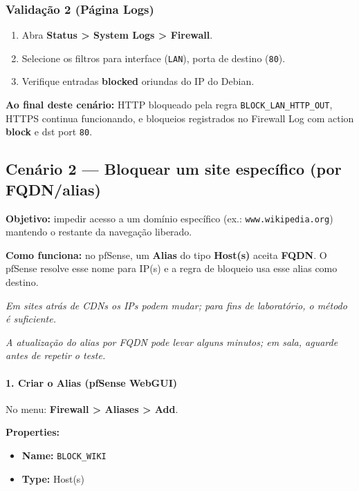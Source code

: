 \subsubsection*{Validação 2 (Página Logs)}

\begin{enumerate}
\item Abra \textbf{Status > System Logs > Firewall}.
\item Selecione os filtros para interface (\texttt{LAN}), porta de destino (\texttt{80}).
\item Verifique entradas \textbf{blocked} oriundas do IP do Debian.
\end{enumerate}


\begin{notebox}
\textbf{Ao final deste cenário:} HTTP bloqueado pela regra \texttt{BLOCK\_LAN\_HTTP\_OUT}, HTTPS continua funcionando, e bloqueios registrados no Firewall Log com action \textbf{block} e dst port \texttt{80}.
\end{notebox}

\subsection{Cenário 2 --- Bloquear um site específico (por FQDN/alias)}

\textbf{Objetivo:} impedir acesso a um domínio específico (ex.: \texttt{www.wikipedia.org}) mantendo o restante da navegação liberado.

\begin{notebox}
\textbf{Como funciona:} no pfSense, um \textbf{Alias} do tipo \textbf{Host(s)} aceita \textbf{FQDN}. O pfSense resolve esse nome para IP(s) e a regra de bloqueio usa esse alias como destino.

\textit{Em sites atrás de CDNs os IPs podem mudar; para fins de laboratório, o método é suficiente.}

\textit{A atualização do alias por FQDN pode levar alguns minutos; em sala, aguarde antes de repetir o teste.}
\end{notebox}

\paragraph{1. Criar o Alias (pfSense WebGUI)} No menu: \textbf{Firewall > Aliases > Add}.

\textbf{Properties:}
\begin{itemize}
  \item \textbf{Name:} \texttt{BLOCK\_WIKI}
  \item \textbf{Type:} Host(s)
\end{itemize}

